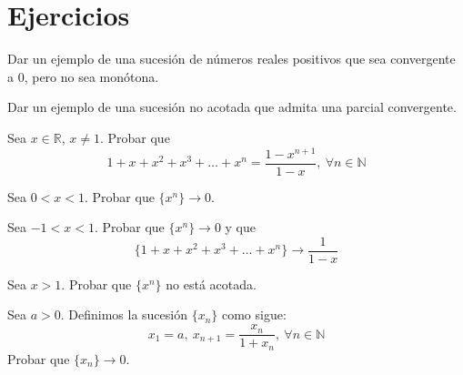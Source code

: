 
\section{Ejercicios}

\begin{ejercicio}\label{ej:6.5.1}
    Dar un ejemplo de una sucesión de números reales positivos que sea convergente a 0, pero no sea monótona.
\end{ejercicio}

\begin{ejercicio}\label{ej:6.5.2}
    Dar un ejemplo de una sucesión no acotada que admita una parcial convergente.
\end{ejercicio}

\begin{ejercicio}\label{ej:6.5.3}
    Sea $x \in \mathbb{R}$, $x \neq 1$. Probar que
    \begin{equation*}
        1+x+x^2+x^3+\dots+x^n=\frac{1-x^{n+1}}{1-x}, ~\forall n \in \mathbb{N}
    \end{equation*}
\end{ejercicio}

\begin{ejercicio}\label{ej:6.5.4}
    Sea $0 < x < 1$. Probar que $\{x^n\} \longrightarrow 0$.
\end{ejercicio}

\begin{ejercicio}\label{ej:6.5.5}
    Sea $-1 < x < 1$. Probar que $\{x^n\} \longrightarrow 0$ y que
    \begin{equation*}
        \{1+x+x^2+x^3+\dots+x^n\} \longrightarrow \frac{1}{1-x}
    \end{equation*}
\end{ejercicio}

\begin{ejercicio}\label{ej:6.5.6}
    Sea $x > 1$. Probar que $\{x^n\}$ no está acotada.
\end{ejercicio}

\begin{ejercicio}\label{ej:6.5.7}
    Sea $a > 0$. Definimos la sucesión $\{x_n\}$ como sigue:
    \begin{equation*}
        x_1 = a, ~ x_{n+1} = \frac{x_n}{1+x_n}, ~\forall n \in \mathbb{N}
    \end{equation*}
    Probar que $\{x_n\} \longrightarrow 0$.
\end{ejercicio}

